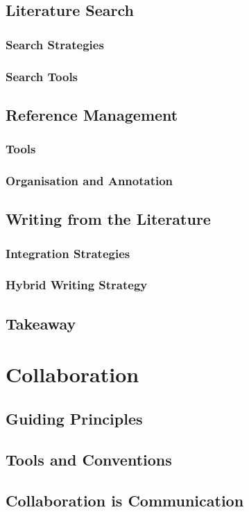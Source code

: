 \documentclass[12pt]{article}
\begin{document}
\subsection{Literature Search}
\subsubsection{Search Strategies}
\subsubsection{Search Tools}
\subsection{Reference Management}
\subsubsection{Tools}
\subsubsection{Organisation and Annotation}
\subsection{Writing from the Literature}
\subsubsection{Integration Strategies}
\subsubsection{Hybrid Writing Strategy}
\subsection{Takeaway}

\section{Collaboration}
\subsection{Guiding Principles}
\subsection{Tools and Conventions}
\subsection{Collaboration is Communication}
\end{document}
